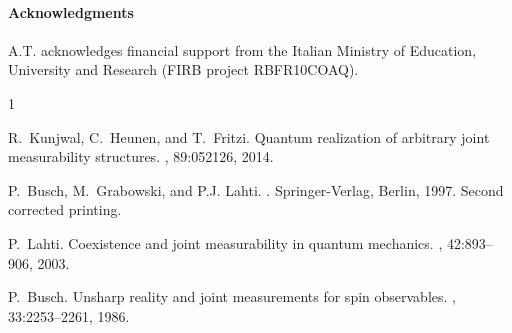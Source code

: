 \documentclass[12pt]{amsart}
\theoremstyle{definition}
\begin{document}
\paragraph{\textbf{Acknowledgments}} {A.T. acknowledges financial support from the Italian Ministry of Education, University and Research (FIRB project RBFR10COAQ).}



\begin{thebibliography}{1}

R.~Kunjwal, C.~Heunen, and T.~Fritzi.
\newblock Quantum realization of arbitrary joint measurability structures.
, 89:052126, 2014.

P.~Busch, M.~Grabowski, and P.J. Lahti.
.
\newblock Springer-Verlag, Berlin, 1997.
\newblock Second corrected printing.

P.~Lahti.
\newblock Coexistence and joint measurability in quantum mechanics.
, 42:893--906, 2003.

P.~Busch.
\newblock Unsharp reality and joint measurements for spin observables.
, 33:2253--2261, 1986.

\end{thebibliography}

\end{document}
